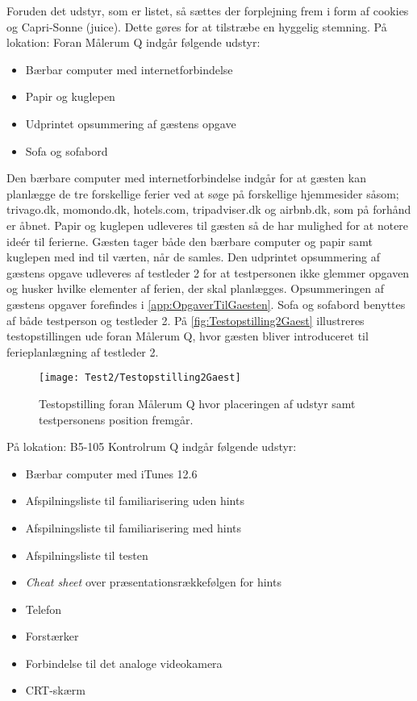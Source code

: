 Foruden det udstyr, som er listet, så sættes der forplejning frem i form af cookies og Capri-Sonne (juice). Dette gøres for at tilstræbe en hyggelig stemning. \blankline  
%
På lokation: Foran Målerum Q indgår følgende udstyr: 
\begin{itemize}
  \item Bærbar computer med internetforbindelse 
  \item Papir og kuglepen 
  \item Udprintet opsummering af gæstens opgave
  \item Sofa og sofabord\blankline
\noindent
\end{itemize}
%
Den bærbare computer med internetforbindelse indgår for at gæsten kan planlægge de tre forskellige ferier ved at søge på forskellige hjemmesider såsom; trivago.dk, momondo.dk, hotels.com, tripadviser.dk og airbnb.dk, som på forhånd er åbnet. Papir og kuglepen udleveres til gæsten så de har mulighed for at notere ideér til ferierne. Gæsten tager både den bærbare computer og papir samt kuglepen med ind til værten, når de samles. Den udprintet opsummering af gæstens opgave udleveres af testleder 2 for at testpersonen ikke glemmer opgaven og husker hvilke elementer af ferien, der skal planlægges. Opsummeringen af gæstens opgaver forefindes i \autoref{app:OpgaverTilGaesten}. Sofa og sofabord benyttes af både testperson og testleder 2. På \autoref{fig:Testopstilling2Gaest} illustreres testopstillingen ude foran Målerum Q, hvor gæsten bliver introduceret til ferieplanlægning af testleder 2.  
%
\begin{figure}[H]
	\centering
	\texttt{[image: Test2/Testopstilling2Gaest]}
	\caption{Testopstilling foran Målerum Q hvor placeringen af udstyr samt testpersonens position fremgår.}
	\label{fig:Testopstilling2Gaest}
\end{figure}
\noindent
% 
På lokation: B5-105 Kontrolrum Q indgår følgende udstyr:
\begin{itemize}
  \item Bærbar computer med iTunes 12.6
  \item Afspilningsliste til familiarisering uden hints 
  \item Afspilningsliste til familiarisering med hints
  \item Afspilningsliste til testen
  \item \textit{Cheat sheet} over præsentationsrækkefølgen for hints 
  \item Telefon
  \item Forstærker 
  \item Forbindelse til det analoge videokamera
  \item CRT-skærm \blankline
\noindent
\end{itemize}
